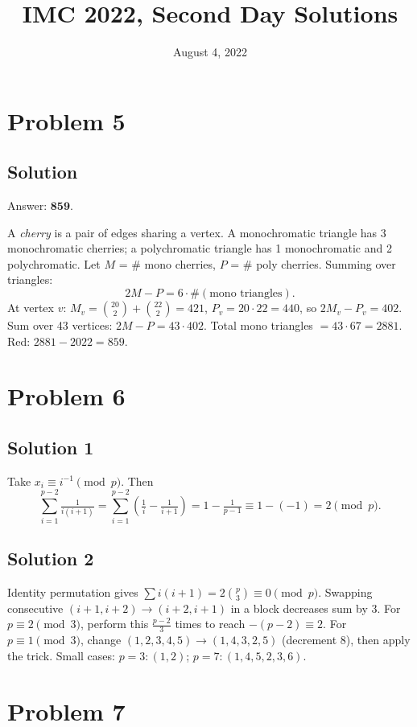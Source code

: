 \documentclass{article}
\title{IMC 2022, Second Day Solutions}
\date{August 4, 2022}
\begin{document}
\maketitle

\section*{Problem 5}
\subsection*{Solution}
Answer: $\mathbf{859}$.

A \emph{cherry} is a pair of edges sharing a vertex. A monochromatic triangle has 3 monochromatic cherries; a polychromatic triangle has 1 monochromatic and 2 polychromatic. Let $M$ = \# mono cherries, $P$ = \# poly cherries. Summing over triangles:
\[ 2M - P = 6 \cdot \#(\text{mono triangles}). \]
At vertex $v$: $M_v = \binom{20}{2} + \binom{22}{2} = 421$, $P_v = 20 \cdot 22 = 440$, so $2M_v - P_v = 402$. Sum over 43 vertices: $2M - P = 43 \cdot 402$. Total mono triangles $= 43 \cdot 67 = 2881$. Red: $2881 - 2022 = 859$.

\section*{Problem 6}
\subsection*{Solution 1}
Take $x_i \equiv i^{-1} \pmod p$. Then
\[ \sum_{i=1}^{p-2} \tfrac{1}{i(i+1)} = \sum_{i=1}^{p-2}\left(\tfrac{1}{i} - \tfrac{1}{i+1}\right) = 1 - \tfrac{1}{p-1} \equiv 1 - (-1) = 2 \pmod p. \]

\subsection*{Solution 2}
Identity permutation gives $\sum i(i+1) = 2\binom{p}{3} \equiv 0 \pmod p$. Swapping consecutive $(i+1, i+2) \to (i+2, i+1)$ in a block decreases sum by $3$. For $p \equiv 2 \pmod 3$, perform this $\tfrac{p-2}{3}$ times to reach $-(p-2) \equiv 2$. For $p \equiv 1 \pmod 3$, change $(1,2,3,4,5) \to (1,4,3,2,5)$ (decrement 8), then apply the trick. Small cases: $p=3 \colon (1,2)$; $p=7 \colon (1,4,5,2,3,6)$.

\section*{Problem 7}
\end{document}
